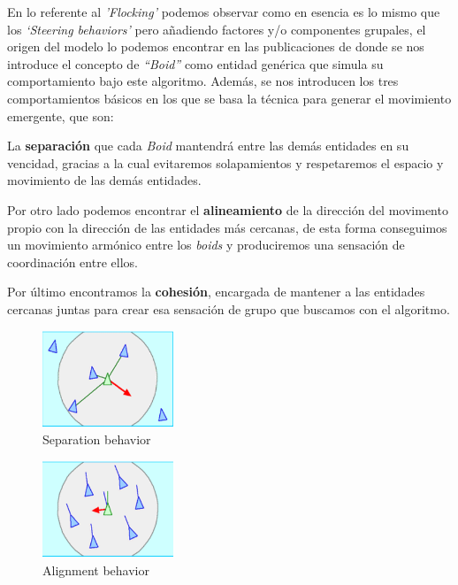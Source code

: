 En lo referente al \textit{'Flocking'} podemos observar como en esencia es lo mismo que
los \textit{`Steering behaviors'} pero añadiendo factores y/o componentes grupales,
el origen del modelo lo podemos encontrar en las publicaciones de \cite{Boids1986} donde
se nos introduce el concepto de \textit{``Boid''} como entidad genérica que simula su
comportamiento bajo este algoritmo. Además, se nos introducen los tres comportamientos
básicos en los que se basa la técnica para generar el movimiento emergente, que son:

La \textbf{separación} que cada \textit{Boid} mantendrá entre
las demás entidades en su vencidad, gracias a la cual evitaremos solapamientos y respetaremos el
espacio y movimiento de las demás entidades.

Por otro lado podemos encontrar el \textbf{alineamiento} de la
dirección del movimento propio con la dirección de las entidades más cercanas, de esta forma conseguimos un
movimiento armónico entre los \textit{boids} y produciremos una sensación de
coordinación entre ellos.

Por último encontramos la \textbf{cohesión}, encargada de mantener a las entidades cercanas juntas para crear esa
sensación de grupo que buscamos con el algoritmo.

\begin{figure}[ht]
\centering
\includegraphics[width=0.35\textwidth]{imagenes/marco_teo/separation.png}
\caption{Separation behavior}
\label{img:separation-b}
\end{figure}

\begin{figure}[ht]
\centering
\includegraphics[width=0.35\textwidth]{imagenes/marco_teo/alignment.png}
\caption{Alignment behavior}
\label{img:alignment-b}
\end{figure}

